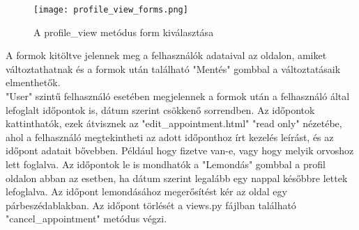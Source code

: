 \begin{figure}[!htbp]
	\caption{A profile\_view metódus form kiválasztása}
	\label{fig:profileviewformkivalasztas}
	\centering
	\texttt{[image: profile\_view\_forms.png]}
\end{figure}

A formok kitöltve jelennek meg a felhasználók adataival az oldalon, amiket változtathatnak és a formok után található "Mentés" gombbal a változtatásaik elmenthetők.\\

"User" szintű felhasználó esetében megjelennek a formok után a felhasználó által lefoglalt időpontok is, dátum szerint csökkenő sorrendben. Az időpontok kattinthatók, ezek átvisznek az "edit\_appointment.html" "read only" nézetébe, ahol a felhasználó megtekintheti az adott időponthoz írt kezelés leírást, és az időpont adatait bővebben. Például hogy fizetve van-e, vagy hogy melyik orvoshoz lett foglalva. Az időpontok le is mondhatók a "Lemondás" gombbal a profil oldalon abban az esetben, ha dátum szerint legalább egy nappal későbbre lettek lefoglalva. Az időpont lemondásához megerősítést kér az oldal egy párbeszédablakban. Az időpont törlését a views.py fájlban található "cancel\_appointment" metódus végzi.
